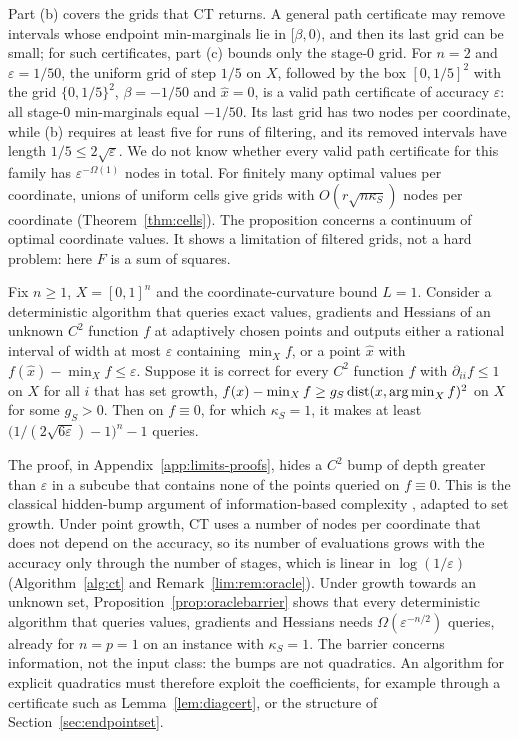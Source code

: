 Part (b) covers the grids that CT returns. A general path certificate may
remove intervals whose endpoint min-marginals lie in $[\beta,0)$, and then
its last grid can be small; for such certificates, part (c) bounds only the
stage-$0$ grid. For
$n=2$ and $\varepsilon=1/50$, the uniform grid of step $1/5$ on $X$, followed by
the box $[0,1/5]^2$ with the grid $\{0,1/5\}^2$, $\beta=-1/50$ and $\hat x=0$,
is a valid path certificate of accuracy $\varepsilon$: all stage-$0$
min-marginals equal $-1/50$. Its last grid has two nodes per coordinate,
while (b) requires at least five for runs of filtering, and its removed
intervals have length $1/5\le2\sqrt\varepsilon$. We do not know whether every
valid path certificate for this family has $\varepsilon^{-\Omega(1)}$ nodes in
total. For finitely many optimal values per coordinate, unions of uniform
cells give grids with $O(r\sqrt{n\kappa_S})$ nodes per coordinate
(Theorem~\ref{thm:cells}). The proposition concerns a
continuum of optimal coordinate values. It shows a limitation of filtered
grids, not a hard problem: here $F$ is a sum of squares.

\begin{proposition}\label{prop:oraclebarrier}
Fix $n\ge1$, $X=[0,1]^n$ and the coordinate-curvature bound $L=1$. Consider a
deterministic algorithm that queries exact values, gradients and Hessians of
an unknown $C^2$ function $f$ at adaptively chosen points and outputs either a
rational interval of width at most $\varepsilon$ containing $\min_Xf$, or a
point $\hat x$ with $f(\hat x)-\min_Xf\le\varepsilon$. Suppose it is correct
for every $C^2$ function $f$ with $\partial_{ii}f\le1$ on $X$ for all $i$ that
has set growth, $f(x)-\min_Xf\ge g_S\operatorname{dist}(x,\operatorname*{arg\,min}_Xf)^2$ on $X$ for some
$g_S>0$. Then on $f\equiv0$, for which $\kappa_S=1$, it makes at least
$\bigl(1/(2\sqrt{6\varepsilon})-1\bigr)^n-1$ queries.
\end{proposition}

The proof, in Appendix~\ref{app:limits-proofs}, hides a $C^2$ bump of depth
greater than $\varepsilon$ in a subcube that contains none of the points
queried on $f\equiv0$. This is the classical hidden-bump argument of
information-based complexity \cite{NemirovskiYudin1983}, adapted to set
growth. Under point growth, CT uses a number of nodes per coordinate that
does not depend on the accuracy, so its number of evaluations grows with the
accuracy only through the number of stages, which is linear in
$\log(1/\varepsilon)$ (Algorithm~\ref{alg:ct} and
Remark~\ref{lim:rem:oracle}). Under growth towards an unknown set,
Proposition~\ref{prop:oraclebarrier} shows that every deterministic algorithm
that queries values, gradients and Hessians needs
$\Omega(\varepsilon^{-n/2})$ queries, already for $n=p=1$ on an instance with
$\kappa_S=1$. The barrier concerns information, not the input class: the
bumps are not quadratics. An algorithm for explicit quadratics must therefore
exploit the coefficients, for example through a certificate such as
Lemma~\ref{lem:diagcert}, or the structure of Section~\ref{sec:endpointset}.

